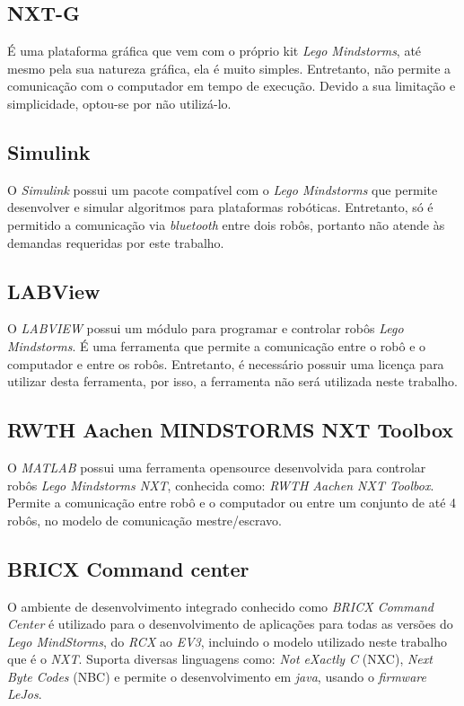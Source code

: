 \subsection{NXT-G}
\label{subsec:nxtg}
É uma plataforma gráfica que vem com o próprio kit \emph{Lego Mindstorms}, até mesmo pela sua natureza gráfica, ela é muito simples. Entretanto, não permite a comunicação com o computador em tempo de execução. Devido a sua limitação e simplicidade, optou-se por não utilizá-lo.

\subsection{Simulink}
\label{subsec:simulink}
O \emph{Simulink} possui um pacote compatível com o \emph{Lego Mindstorms} que permite desenvolver e simular algoritmos para plataformas robóticas. Entretanto, só é permitido a comunicação via \emph{bluetooth} entre dois robôs, portanto não atende às demandas requeridas por este trabalho.  

\subsection{LABView}
\label{subsec:labview}
O \emph{LABVIEW} possui um módulo para programar e controlar robôs \emph{Lego Mindstorms}. É uma ferramenta que permite a comunicação entre o robô e o computador e entre os robôs. Entretanto, é necessário possuir uma licença para utilizar desta ferramenta, por isso, a ferramenta não será utilizada neste trabalho.


\subsection{RWTH Aachen MINDSTORMS NXT Toolbox}
\label{subsec:rwth}
O \emph{MATLAB} possui uma ferramenta opensource desenvolvida para controlar robôs \emph{Lego Mindstorms NXT}, conhecida como: \emph{RWTH Aachen NXT Toolbox}. Permite a comunicação entre robô e o computador ou entre um conjunto de até 4 robôs, no modelo de comunicação mestre/escravo. 

\subsection{BRICX Command center}
\label{subsec:Bricx}
O ambiente de desenvolvimento integrado conhecido como \emph{BRICX Command Center} é utilizado para o desenvolvimento de aplicações para todas as versões do \emph{Lego MindStorms}, do \emph{RCX} ao \emph{EV3}, incluindo o modelo utilizado neste trabalho que é o \emph{NXT}. Suporta diversas linguagens como: \emph{Not eXactly C} (NXC), \emph{Next Byte Codes} (NBC) e permite o desenvolvimento em \emph{java}, usando o \emph{firmware LeJos}. %

